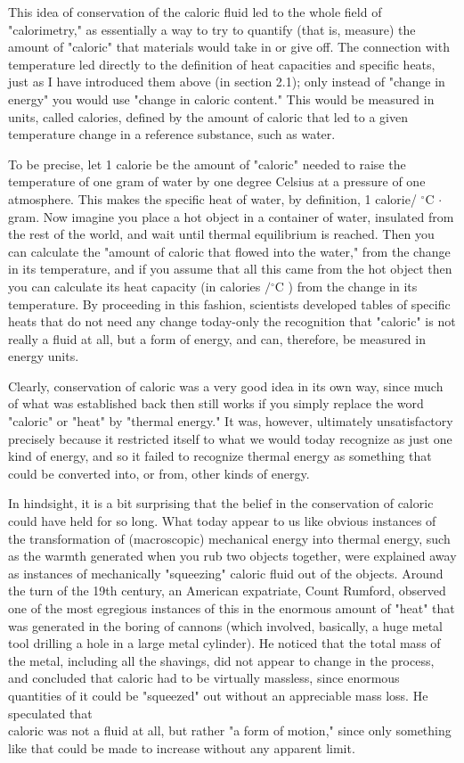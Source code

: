\documentclass[10pt]{article}
\begin{document}
This idea of conservation of the caloric fluid led to the whole field of "calorimetry," as essentially a way to try to quantify (that is, measure) the amount of "caloric" that materials would take in or give off. The connection with temperature led directly to the definition of heat capacities and specific heats, just as I have introduced them above (in section 2.1); only instead of "change in energy" you would use "change in caloric content." This would be measured in units, called calories, defined by the amount of caloric that led to a given temperature change in a reference substance, such as water.

To be precise, let 1 calorie be the amount of "caloric" needed to raise the temperature of one gram of water by one degree Celsius at a pressure of one atmosphere. This makes the specific heat of water, by definition, 1 calorie/ ${ }^{\circ} \mathrm{C}$ $\cdot$gram. Now imagine you place a hot object in a container of water, insulated from the rest of the world, and wait until thermal equilibrium is reached. Then you can calculate the "amount of caloric that flowed into the water," from the change in its temperature, and if you assume that all this came from the hot object then you can calculate its heat capacity (in calories $/{ }^{\circ} \mathrm{C}$ ) from the change in its temperature. By proceeding in this fashion, scientists developed tables of specific heats that do not need any change today-only the recognition that "caloric" is not really a fluid at all, but a form of energy, and can, therefore, be measured in energy units.

Clearly, conservation of caloric was a very good idea in its own way, since much of what was established back then still works if you simply replace the word "caloric" or "heat" by "thermal energy." It was, however, ultimately unsatisfactory precisely because it restricted itself to what we would today recognize as just one kind of energy, and so it failed to recognize thermal energy as something that could be converted into, or from, other kinds of energy.

In hindsight, it is a bit surprising that the belief in the conservation of caloric could have held for so long. What today appear to us like obvious instances of the transformation of (macroscopic) mechanical energy into thermal energy, such as the warmth generated when you rub two objects together, were explained away as instances of mechanically "squeezing" caloric fluid out of the objects. Around the turn of the 19th century, an American expatriate, Count Rumford, observed one of the most egregious instances of this in the enormous amount of "heat" that was generated in the boring of cannons (which involved, basically, a huge metal tool drilling a hole in a large metal cylinder). He noticed that the total mass of the metal, including all the shavings, did not appear to change in the process, and concluded that caloric had to be virtually massless, since enormous quantities of it could be "squeezed" out without an appreciable mass loss. He speculated that\\
caloric was not a fluid at all, but rather "a form of motion," since only something like that could be made to increase without any apparent limit.
\end{document}
